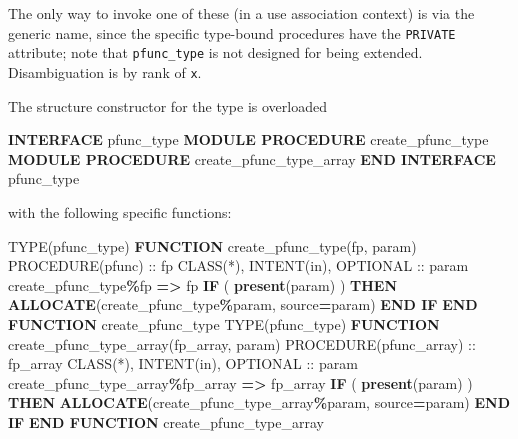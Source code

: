 \documentclass[
  paper=a4,
  ,captions=tableheading
]{scrartcl}
\newenvironment{Shaded}{\begin{snugshade}}{\end{snugshade}}
\newcommand{\DataTypeTok}[1]{\textcolor[rgb]{0.13,0.29,0.53}{#1}}
\newcommand{\FunctionTok}[1]{\textcolor[rgb]{0.13,0.29,0.53}{\textbf{#1}}}
\newcommand{\KeywordTok}[1]{\textcolor[rgb]{0.13,0.29,0.53}{\textbf{#1}}}
\newcommand{\NormalTok}[1]{#1}
\newcommand{\OperatorTok}[1]{\textcolor[rgb]{0.81,0.36,0.00}{\textbf{#1}}}
\begin{document}
The only way to invoke one of these (in a use association context) is
via the generic name, since the specific type-bound procedures have the
\texttt{PRIVATE} attribute; note that \texttt{pfunc\_type} is not
designed for being extended. Disambiguation is by rank of \texttt{x}.

The structure constructor for the type is overloaded

\begin{Shaded}
\begin{Highlighting}[]
\KeywordTok{INTERFACE}\NormalTok{ pfunc\_type}
   \KeywordTok{MODULE PROCEDURE}\NormalTok{ create\_pfunc\_type}
   \KeywordTok{MODULE PROCEDURE}\NormalTok{ create\_pfunc\_type\_array}
\KeywordTok{END INTERFACE}\NormalTok{ pfunc\_type}
\end{Highlighting}
\end{Shaded}

with the following specific functions:

\begin{Shaded}
\begin{Highlighting}[]
\DataTypeTok{TYPE(pfunc\_type)} \KeywordTok{FUNCTION}\NormalTok{ create\_pfunc\_type(fp, param)}
   \DataTypeTok{PROCEDURE(pfunc)} \DataTypeTok{::}\NormalTok{ fp}
   \DataTypeTok{CLASS(*)}\NormalTok{, }\DataTypeTok{INTENT(in)}\NormalTok{, }\DataTypeTok{OPTIONAL} \DataTypeTok{::}\NormalTok{ param}
\NormalTok{   create\_pfunc\_type}\OperatorTok{\%}\NormalTok{fp }\KeywordTok{=}\OperatorTok{\textgreater{}}\NormalTok{ fp}
   \KeywordTok{IF}\NormalTok{ ( }\FunctionTok{present}\NormalTok{(param) ) }\KeywordTok{THEN}
      \KeywordTok{ALLOCATE}\NormalTok{(create\_pfunc\_type}\OperatorTok{\%}\NormalTok{param, source}\KeywordTok{=}\NormalTok{param)}
   \KeywordTok{END IF}
\KeywordTok{END FUNCTION}\NormalTok{ create\_pfunc\_type}
\DataTypeTok{TYPE(pfunc\_type)} \KeywordTok{FUNCTION}\NormalTok{ create\_pfunc\_type\_array(fp\_array, param)}
   \DataTypeTok{PROCEDURE(pfunc\_array)} \DataTypeTok{::}\NormalTok{ fp\_array}
   \DataTypeTok{CLASS(*)}\NormalTok{, }\DataTypeTok{INTENT(in)}\NormalTok{, }\DataTypeTok{OPTIONAL} \DataTypeTok{::}\NormalTok{ param}
\NormalTok{   create\_pfunc\_type\_array}\OperatorTok{\%}\NormalTok{fp\_array }\KeywordTok{=}\OperatorTok{\textgreater{}}\NormalTok{ fp\_array}
   \KeywordTok{IF}\NormalTok{ ( }\FunctionTok{present}\NormalTok{(param) ) }\KeywordTok{THEN}
      \KeywordTok{ALLOCATE}\NormalTok{(create\_pfunc\_type\_array}\OperatorTok{\%}\NormalTok{param, source}\KeywordTok{=}\NormalTok{param)}
   \KeywordTok{END IF}
\KeywordTok{END FUNCTION}\NormalTok{ create\_pfunc\_type\_array}
\end{Highlighting}
\end{Shaded}
\end{document}
